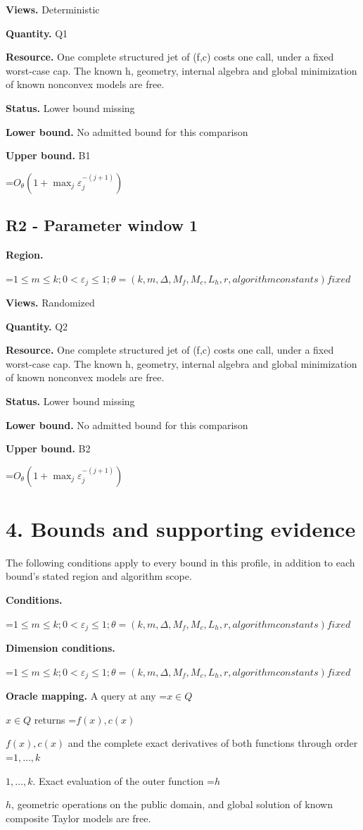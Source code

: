 \documentclass[10pt,a4paper]{article}
\newcommand{\AtlasMath}[1]{\par\begingroup\centering\setbox0=\hbox{$\displaystyle #1$}\ifdim\wd0>1.4\linewidth\typeout{ATLAS WIDE FORMULA: \the\wd0}\fi\ifdim\wd0>\linewidth\resizebox{\linewidth}{!}{\box0}\else\box0\fi\par\endgroup}
\newcommand{\AtlasInlineMath}[1]{\begingroup\setbox0=\hbox{$#1$}\ifdim\wd0>.4\linewidth\endgroup\AtlasMath{#1}\else\endgroup$#1$\fi}
\begin{document}
\textbf{Views.} Deterministic

\textbf{Quantity.} Q1

\textbf{Resource.} One complete structured jet of (f,c) costs one call, under a fixed worst-case cap. The known h, geometry, internal algebra and global minimization of known nonconvex models are free.

\textbf{Status.} Lower bound missing

\textbf{Lower bound.} No admitted bound for this comparison

\textbf{Upper bound.} B1

\AtlasMath{O_\theta(1+\max_j \varepsilon_j^{-(j+1)})}
\subsection{R2 - Parameter window 1}
\textbf{Region.} 
\AtlasMath{1\le m\le k;0<\varepsilon_j\le 1;\theta=(k,m,\Delta,M_f,M_c,L_h,r,algorithm constants) fixed}


\textbf{Views.} Randomized

\textbf{Quantity.} Q2

\textbf{Resource.} One complete structured jet of (f,c) costs one call, under a fixed worst-case cap. The known h, geometry, internal algebra and global minimization of known nonconvex models are free.

\textbf{Status.} Lower bound missing

\textbf{Lower bound.} No admitted bound for this comparison

\textbf{Upper bound.} B2

\AtlasMath{O_\theta(1+\max_j \varepsilon_j^{-(j+1)})}
\section{4. Bounds and supporting evidence}
The following conditions apply to every bound in this profile, in addition to each bound's stated region and algorithm scope.

\textbf{Conditions.} 
\AtlasMath{1\le m\le k;0<\varepsilon_j\le 1;\theta=(k,m,\Delta,M_f,M_c,L_h,r,algorithm constants) fixed}


\textbf{Dimension conditions.} 
\AtlasMath{1\le m\le k;0<\varepsilon_j\le 1;\theta=(k,m,\Delta,M_f,M_c,L_h,r,algorithm constants) fixed}


\textbf{Oracle mapping.} A query at any \AtlasInlineMath{x\in Q} returns \AtlasInlineMath{f(x),c(x)} and the complete exact derivatives of both functions through order \AtlasInlineMath{1,\ldots,k}. Exact evaluation of the outer function \AtlasInlineMath{h}, geometric operations on the public domain, and global solution of known composite Taylor models are free.
\end{document}
